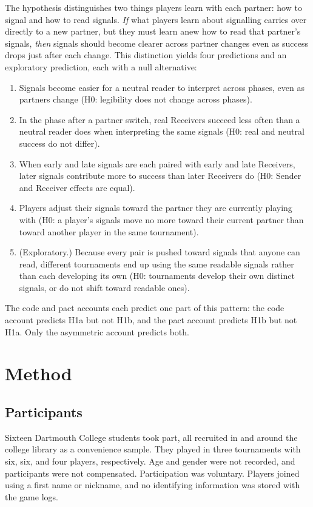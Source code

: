 \documentclass[stu,11pt,floatsintext,donotrepeattitle]{apa7}
\begin{document}
The hypothesis distinguishes two things players learn with each partner: how to signal and how to read signals. \emph{If} what players learn about signalling carries over directly to a new partner, but they must learn anew how to read that partner's signals, \emph{then} signals should become clearer across partner changes even as success drops just after each change. This distinction yields four predictions and an exploratory prediction, each with a null alternative:
\begin{enumerate}
\item[H1a.] Signals become easier for a neutral reader to interpret across phases, even as partners change (H0: legibility does not change across phases).
\item[H1b.] In the phase after a partner switch, real Receivers succeed less often than a neutral reader does when interpreting the same signals (H0: real and neutral success do not differ).
\item[H1c.] When early and late signals are each paired with early and late Receivers, later signals contribute more to success than later Receivers do (H0: Sender and Receiver effects are equal).
\item[H1d.] Players adjust their signals toward the partner they are currently playing with (H0: a player's signals move no more toward their current partner than toward another player in the same tournament).
\item[H1e.] (Exploratory.) Because every pair is pushed toward signals that anyone can read, different tournaments end up using the same readable signals rather than each developing its own (H0: tournaments develop their own distinct signals, or do not shift toward readable ones).
\end{enumerate}
The code and pact accounts each predict one part of this pattern: the code account predicts H1a but not H1b, and the pact account predicts H1b but not H1a. Only the asymmetric account predicts both.

\section{Method}

\subsection{Participants}

Sixteen Dartmouth College students took part, all recruited in and around the college library as a convenience sample. They played in three tournaments with six, six, and four players, respectively.
Age and gender were not recorded, and participants were not compensated.
Participation was voluntary. Players joined using a first name or nickname, and no identifying information was stored with the game logs.
\end{document}
